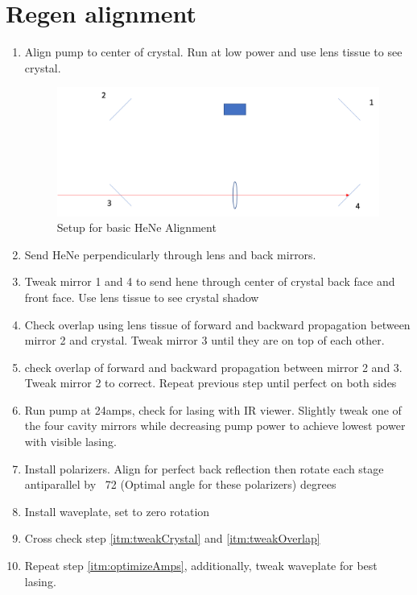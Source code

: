 \documentclass{article}
\begin{document}
\section{Regen alignment}
\begin{enumerate}
    \item Align pump to center of crystal. Run at low power and use lens tissue to see crystal.
    \begin{figure}[h!]
        \centering
        \includegraphics[width=1.0\textwidth]{Regen Alignment/HeNe Alignment}
        \caption{Setup for basic HeNe Alignment}
        \label{fig:my_label}
    \end{figure}
    \item Send HeNe perpendicularly through lens and back mirrors.
    \item \label{itm:tweakCrystal} Tweak mirror 1 and 4 to send hene through center of crystal back face and front face. Use lens tissue to see crystal shadow
    \item \label{itm:tweakOverlap} Check overlap using lens tissue of forward and backward propagation between mirror 2 and crystal. Tweak mirror 3 until they are on top of each other.
    \item check overlap of forward and backward propagation between mirror 2 and 3. Tweak mirror 2 to correct. Repeat previous step until perfect on both sides
    \item \label{itm:optimizeAmps} Run pump at 24amps, check for lasing with IR viewer. Slightly tweak one of the four cavity mirrors while decreasing pump power to achieve lowest power with visible lasing.
    \item Install polarizers. Align for perfect back reflection then rotate each stage antiparallel by ~72 (Optimal angle for these polarizers) degrees
    \item Install waveplate, set to zero rotation
    \item Cross check step \ref{itm:tweakCrystal} and \ref{itm:tweakOverlap}
    \item Repeat step \ref{itm:optimizeAmps}, additionally, tweak waveplate for best lasing.

\end{enumerate}
\end{document}
